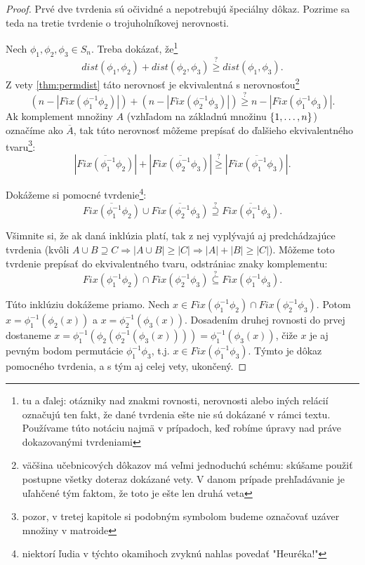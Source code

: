 \begin{proof}
Prvé dve tvrdenia sú očividné a nepotrebujú špeciálny dôkaz.
Pozrime sa teda na tretie tvrdenie o trojuholníkovej nerovnosti.

Nech $\phi_1, \phi_2, \phi_3 \in S_n$. 
Treba dokázať, že\footnote{tu a ďalej: otázniky nad znakmi rovnosti, nerovnosti alebo iných relácií označujú ten fakt, že dané tvrdenia ešte nie sú dokázané v rámci textu. 
Používame túto notáciu najmä v prípadoch, keď robíme úpravy nad práve dokazovanými tvrdeniami} 
$$dist(\phi_1, \phi_2) + dist(\phi_2, \phi_3) \overset{?}{\geq} dist(\phi_1, \phi_3).$$
Z vety \ref{thm:permdist} táto nerovnosť je ekvivalentná s nerovnosťou\footnote{väčšina učebnicových dôkazov má veľmi jednoduchú schému: skúšame použiť postupne všetky doteraz dokázané vety. 
V danom prípade prehľadávanie je uľahčené tým faktom, že toto je ešte len druhá veta}
$$(n - |Fix(\phi_1^{-1}\phi_2)|) + (n - |Fix(\phi_2^{-1}\phi_3)|) \overset{?}{\geq} n - |Fix(\phi_1^{-1}\phi_3)|.$$
Ak komplement množiny $A$ (vzhľadom na základnú množinu $\left\{1, \ldots, n\right\}$) označíme ako $\overline{A}$, tak túto nerovnosť môžeme prepísať do ďalšieho ekvivalentného tvaru\footnote{pozor, v tretej kapitole si podobným symbolom budeme označovať uzáver množiny v matroide}:
$$|\overline{Fix(\phi_1^{-1}\phi_2)}| + |\overline{Fix(\phi_2^{-1}\phi_3)}| \overset{?}{\geq} |\overline{Fix(\phi_1^{-1}\phi_3)}|.$$

Dokážeme si pomocné tvrdenie\footnote{niektorí ľudia v týchto okamihoch zvyknú nahlas povedať "Heuréka!"}: 
$$\overline{Fix(\phi_1^{-1}\phi_2)} \cup \overline{Fix(\phi_2^{-1}\phi_3)} \overset{?}{\supseteq} \overline{Fix(\phi_1^{-1}\phi_3)}.$$

Všimnite si, že ak daná inklúzia platí, tak z nej vyplývajú aj predchádzajúce tvrdenia (kvôli $A \cup B \supseteq C \Longrightarrow |A \cup B| \geq |C| \Longrightarrow |A| + |B| \geq |C|$).
Môžeme toto tvrdenie prepísať do ekvivalentného tvaru, odstrániac znaky komplementu:
$$Fix(\phi_1^{-1}\phi_2) \cap Fix(\phi_2^{-1}\phi_3) \overset{?}{\subseteq} Fix(\phi_1^{-1}\phi_3).$$

Túto inklúziu dokážeme priamo. 
Nech $x \in Fix(\phi_1^{-1}\phi_2) \cap Fix(\phi_2^{-1}\phi_3)$. 
Potom $x = \phi_1^{-1}(\phi_2(x))$ a $x = \phi_2^{-1}(\phi_3(x))$.
Dosadením druhej rovnosti do prvej dostaneme $x = \phi_1^{-1}(\phi_2(\phi_2^{-1}(\phi_3(x)))) = \phi_1^{-1}(\phi_3(x))$, čiže $x$ je aj pevným bodom permutácie $\phi_1^{-1} \phi_3$, t.j. $x \in Fix(\phi_1^{-1}\phi_3)$.
Týmto je dôkaz pomocného tvrdenia, a s tým aj celej vety, ukončený.
\end{proof}

